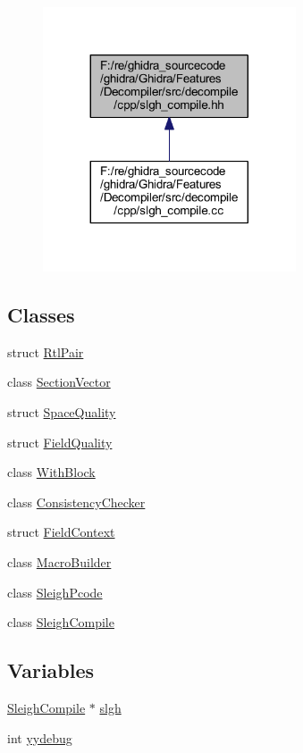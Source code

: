 \begin{figure}[H]
\begin{center}
\leavevmode
\includegraphics[width=212pt]{slgh__compile_8hh__dep__incl}
\end{center}
\end{figure}
\subsection*{Classes}
\begin{DoxyCompactItemize}
\item 
struct \mbox{\hyperlink{struct_rtl_pair}{Rtl\+Pair}}
\item 
class \mbox{\hyperlink{class_section_vector}{Section\+Vector}}
\item 
struct \mbox{\hyperlink{struct_space_quality}{Space\+Quality}}
\item 
struct \mbox{\hyperlink{struct_field_quality}{Field\+Quality}}
\item 
class \mbox{\hyperlink{class_with_block}{With\+Block}}
\item 
class \mbox{\hyperlink{class_consistency_checker}{Consistency\+Checker}}
\item 
struct \mbox{\hyperlink{struct_field_context}{Field\+Context}}
\item 
class \mbox{\hyperlink{class_macro_builder}{Macro\+Builder}}
\item 
class \mbox{\hyperlink{class_sleigh_pcode}{Sleigh\+Pcode}}
\item 
class \mbox{\hyperlink{class_sleigh_compile}{Sleigh\+Compile}}
\end{DoxyCompactItemize}
\subsection*{Variables}
\begin{DoxyCompactItemize}
\item 
\mbox{\hyperlink{class_sleigh_compile}{Sleigh\+Compile}} $\ast$ \mbox{\hyperlink{slgh__compile_8hh_a8e32dbdce421159d99df1fe374420718}{slgh}}
\item 
int \mbox{\hyperlink{slgh__compile_8hh_ab138aa8e11f58bcdcc7134adf240ea8c}{yydebug}}
\end{DoxyCompactItemize}


